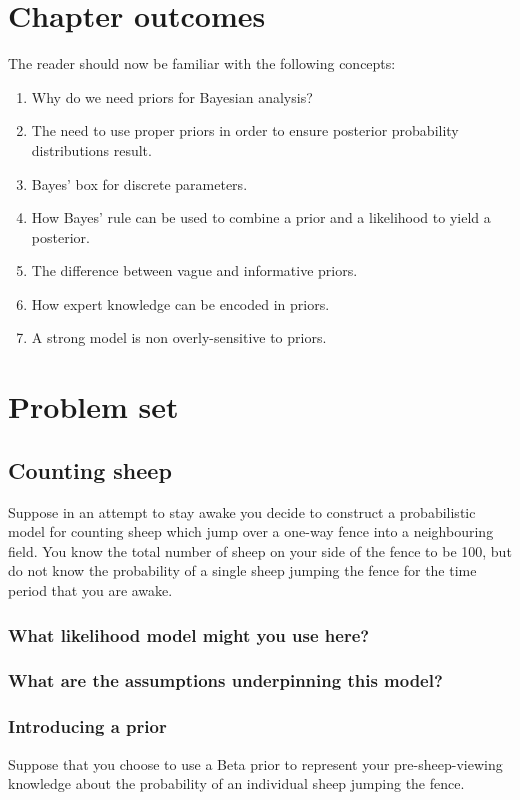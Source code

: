 \documentclass[11pt,fullpage]{book}
\begin{document}
\section{Chapter outcomes}
The reader should now be familiar with the following concepts:
\begin{enumerate}
\item Why do we need priors for Bayesian analysis?
\item The need to use proper priors in order to ensure posterior probability distributions result.
\item Bayes' box for discrete parameters.
\item How Bayes' rule can be used to combine a prior and a likelihood to yield a posterior.
\item The difference between vague and informative priors.
\item How expert knowledge can be encoded in priors.
\item A strong model is non overly-sensitive to priors.
\end{enumerate}

\section{Problem set}
\subsection{Counting sheep}
Suppose in an attempt to stay awake you decide to construct a probabilistic model for counting sheep which jump over a one-way fence into a neighbouring field. You know the total number of sheep on your side of the fence to be 100, but do not know the probability of a single sheep jumping the fence for the time period that you are awake.

\subsubsection{What likelihood model might you use here?}
\subsubsection{What are the assumptions underpinning this model?}

\subsubsection{Introducing a prior}
Suppose that you choose to use a Beta prior to represent your pre-sheep-viewing knowledge about the probability of an individual sheep jumping the fence. 
\end{document}
